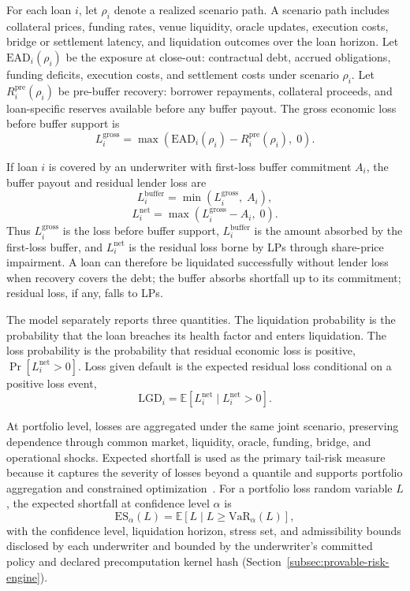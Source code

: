 For each loan $i$, let $\rho_i$ denote a realized scenario path. A scenario path
includes collateral prices, funding rates, venue liquidity, oracle updates,
execution costs, bridge or settlement latency, and liquidation outcomes over
the loan horizon. Let $\mathrm{EAD}_i(\rho_i)$ be the exposure at close-out:
contractual debt, accrued obligations, funding deficits, execution costs, and
settlement costs under scenario $\rho_i$. Let $R^{\mathrm{pre}}_i(\rho_i)$ be
pre-buffer recovery: borrower repayments, collateral proceeds, and
loan-specific reserves available before any buffer payout. The gross
economic loss before buffer support is
\[
  L^{\mathrm{gross}}_i
  =
  \max\!\left(
    \mathrm{EAD}_i(\rho_i) - R^{\mathrm{pre}}_i(\rho_i),\; 0
  \right).
\]

If loan $i$ is covered by an underwriter with first-loss buffer commitment $A_i$,
the buffer payout and residual lender loss are
\[
  L^{\mathrm{buffer}}_i
  =
  \min\!\left(
    L^{\mathrm{gross}}_i,\; A_i
  \right),
\]
\[
  L^{\mathrm{net}}_i
  =
  \max\!\left(
    L^{\mathrm{gross}}_i - A_i,\; 0
  \right).
\]
Thus $L^{\mathrm{gross}}_i$ is the loss before buffer support,
$L^{\mathrm{buffer}}_i$ is the amount absorbed by the first-loss buffer, and
$L^{\mathrm{net}}_i$ is the residual loss borne by LPs through share-price
impairment. A loan can therefore be liquidated successfully without lender loss
when recovery covers the debt; the buffer absorbs shortfall up to its commitment;
residual loss, if any, falls to LPs.

The model separately reports three quantities. The liquidation probability is
the probability that the loan breaches its health factor and enters liquidation.
The loss probability is the probability that residual economic loss is positive,
$\Pr[L^{\mathrm{net}}_i > 0]$. Loss given default is the expected residual loss
conditional on a positive loss event,
\[
  \mathrm{LGD}_i
  =
  \mathbb{E}\!\left[
    L^{\mathrm{net}}_i
    \mid
    L^{\mathrm{net}}_i > 0
  \right].
\]

At portfolio level, losses are aggregated under the same joint scenario, preserving
dependence through common market, liquidity, oracle, funding, bridge, and
operational shocks. Expected shortfall is used as the primary tail-risk measure
because it captures the severity of losses beyond a quantile and supports
portfolio aggregation and constrained optimization~\cite{artzner1999,rockafellar2000}.
For a portfolio loss random variable $L$, the expected shortfall at confidence
level $\alpha$ is
\[
  \mathrm{ES}_{\alpha}(L)
  =
  \mathbb{E}\!\left[
    L \mid L \geq \mathrm{VaR}_{\alpha}(L)
  \right],
\]
with the confidence level, liquidation horizon, stress set, and admissibility
bounds disclosed by each underwriter and bounded by the underwriter's committed policy and declared precomputation kernel hash (Section~\ref{subsec:provable-risk-engine}).

